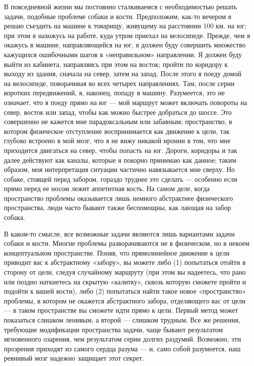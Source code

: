 \documentclass[../main.tex]{subfiles}
\begin{document}
В повседневной жизни мы постоянно сталкиваемся с необходимостью решать задачи, подобные проблеме собаки и кости. Предположим, как-то вечером я решаю съездить на машине к товарищу, живущему на расстоянии 100 км. на юг; при этом я нахожусь на работе, куда утром приехал на велосипеде. Прежде, чем я окажусь в машине, направляющейся на юг, я должен буду совершить множество кажущихся ошибочными шагов в «неправильном» направлении. Я должен буду выйти из кабинета, направляясь при этом на восток; пройти по коридору к выходу из здания, сначала на север, затем на запад. После этого я поеду домой на велосипеде, поворачивая во всех четырех направлениях. Там, после серии коротких передвижений, я, наконец, попаду в машину. Разумеется, это не означает, что я поеду прямо на юг --- мой маршрут может включать повороты на север, восток или запад, чтобы как можно быстрее добраться до шоссе. Это совершенно не кажется мне парадоксальным или забавным; пространство, в котором физическое отступление воспринимается как движение к цели, так глубоко встроено в мой мозг, что я не вижу никакой иронии в том, что мне приходится двигаться на север, чтобы попасть на юг. Дороги, коридоры и так далее действуют как каналы, которые я покорно принимаю как данное; таким образом, моя интерпретация ситуации частично навязывается мне сверху. Но собаке, стоящей перед забором, гораздо труднее это сделать --- особенно если прямо перед ее носом лежит аппетитная кость. На самом деле, когда пространство проблемы оказывается лишь немного абстрактнее физического пространства, люди часто бывают также беспомощны, как лающая на забор собака.

В каком-то смысле, все возможные задачи являются лишь вариантами задачи собаки и кости. Многие проблемы разворачиваются не в физическом, но в некоем концептуальном пространстве. Поняв, что прямолинейное движение к цели приводит вас к абстрактному «забору», вы можете либо (1) попытаться отойти в сторону от цели, следуя случайному маршруту (при этом вы надеетесь, что рано или поздно наткнетесь на скрытую «калитку», сквозь которую сможете пройти и подойти к вашей кости), либо (2) попытаться найти такое новое «пространство» проблемы, в котором не окажется абстрактного забора, отделяющего вас от цели --- в таком пространстве вы сможете идти прямо к цели. Первый метод может показаться слишком ленивым, а второй --- слишком трудным. Все же решения, требующие модификации пространства задачи, чаще бывают результатом мгновенного озарения, чем результатом серии долгих раздумий. Возможно, эти прозрения приходят из самого сердца разума --- и, само собой разумеется, наш ревнивый мозг надежно защищает этот секрет.
\end{document}
